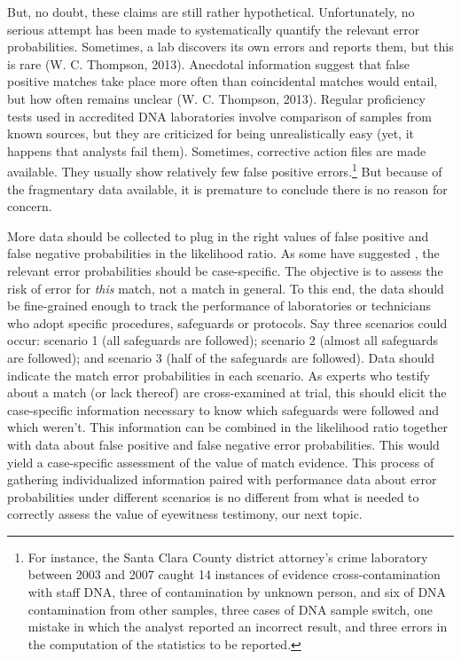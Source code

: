 \documentclass[
  10pt,
  dvipsnames,enabledeprecatedfontcommands]{scrartcl}
\begin{document}
But, no doubt, these claims are still rather hypothetical.
Unfortunately, no serious attempt has been made to systematically
quantify the relevant error probabilities. Sometimes, a lab discovers
its own errors and reports them, but this is rare (W. C. Thompson,
2013). Anecdotal information suggest that false positive matches take
place more often than coincidental matches would entail, but how often
remains unclear (W. C. Thompson, 2013). Regular proficiency tests used
in accredited DNA laboratories involve comparison of samples from known
sources, but they are criticized for being unrealistically easy (yet, it
happens that analysts fail them). Sometimes, corrective action files are
made available. They usually show relatively few false positive
errors.\footnote{For instance, the Santa Clara County district
  attorney's crime laboratory between 2003 and 2007 caught 14 instances
  of evidence cross-contamination with staff DNA, three of contamination
  by unknown person, and six of DNA contamination from other samples,
  three cases of DNA sample switch, one mistake in which the analyst
  reported an incorrect result, and three errors in the computation of
  the statistics to be reported.} But because of the fragmentary data
available, it is premature to conclude there is no reason for concern.

More data should be collected to plug in the right values of false
positive and false negative probabilities in the likelihood ratio. As
some have suggested , the relevant error
probabilities should be case-specific. The objective is to assess the
risk of error for \textit{this} match, not a match in general. To this
end, the data should be fine-grained enough to track the performance of
laboratories or technicians who adopt specific procedures, safeguards or
protocols. Say three scenarios could occur: scenario 1 (all safeguards
are followed); scenario 2 (almost all safeguards are followed); and
scenario 3 (half of the safeguards are followed). Data should indicate
the match error probabilities in each scenario. As experts who testify
about a match (or lack thereof) are cross-examined at trial, this should
elicit the case-specific information necessary to know which safeguards
were followed and which weren't. This information can be combined in the
likelihood ratio together with data about false positive and false
negative error probabilities. This would yield a case-specific
assessment of the value of match evidence. This process of gathering
individualized information paired with performance data about error
probabilities under different scenarios is no different from what is
needed to correctly assess the value of eyewitness testimony, our next
topic.
\end{document}
